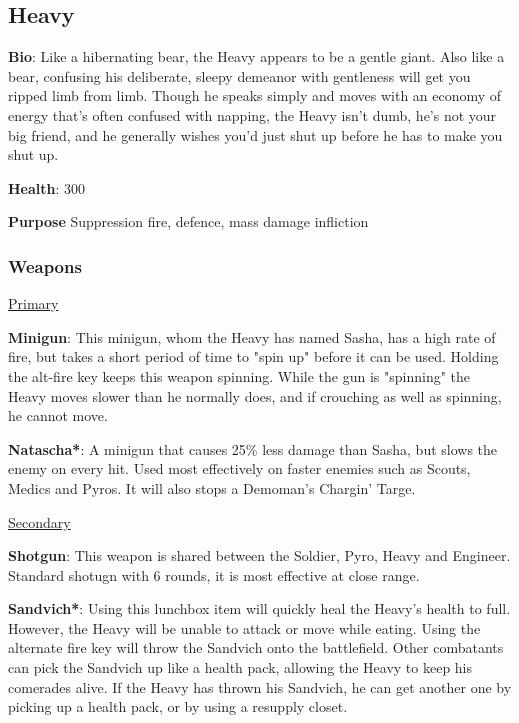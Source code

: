 \subsection{Heavy}
\label{Heavy}
{\bf Bio}:
Like a hibernating bear, the Heavy appears to be a gentle giant. Also like a bear, confusing his deliberate, sleepy demeanor with gentleness will get you ripped limb from limb. Though he speaks simply and moves with an economy of energy that's often confused with napping, the Heavy isn't dumb, he's not your big friend, and he generally wishes you'd just shut up before he has to make you shut up.

{\bf Health}: 300

{\bf Purpose}
Suppression fire, defence, mass damage infliction

\subsubsection {Weapons}


\begin {center}
\underline {Primary}
\end {center}

{\bf Minigun}: This minigun, whom the Heavy has named Sasha, has a high rate of fire, but takes a short period of time to "spin up" before it can be used. Holding the alt-fire key keeps this weapon spinning. While the gun is "spinning" the Heavy moves slower than he normally does, and if crouching as well as spinning, he cannot move.

{\bf Natascha*}: A minigun that causes 25\% less damage than Sasha, but slows the enemy on every hit. Used most effectively on faster enemies such as Scouts, Medics and Pyros. It will also stops a Demoman's Chargin' Targe.


\begin {center}
\underline {Secondary}
\end {center}

{\bf Shotgun}: This weapon is shared between the Soldier, Pyro, Heavy and Engineer. Standard shotugn with 6 rounds, it is most effective at close range.

{\bf Sandvich*}: Using this lunchbox item will quickly heal the Heavy's health to full.  However, the Heavy will be unable to attack or move while eating. Using the alternate fire key will throw the Sandvich onto the battlefield. Other combatants can pick the Sandvich up like a health pack, allowing the Heavy to keep his comerades alive. If the Heavy has thrown his Sandvich, he can get another one by picking up a health pack, or by using a resupply closet.

